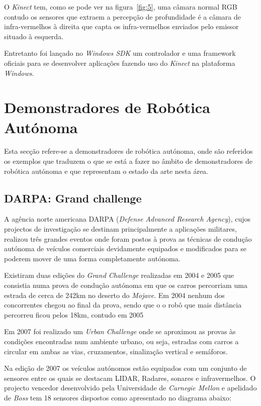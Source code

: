 O \emph{Kinect} tem, como se pode ver na figura~\ref{fig:5}, uma câmara normal RGB 
contudo os sensores que extraem a percepção de profundidade é a câmara de infra-vermelhos à direita
que capta os infra-vermelhos enviados pelo emissor situado à esquerda.

Entretanto foi lançado no \emph{Windows SDK} um controlador e uma framework oficiais para se 
desenvolver aplicações fazendo uso do \emph{Kinect} na plataforma \emph{Windows}.

\section{Demonstradores de Robótica Autónoma}
Esta secção refere-se a demonstradores de robótica autónoma, onde são referidos
os exemplos que traduzem o que se está a fazer no âmbito de demonstradores de
robótica autónoma e que representam o estado da arte nesta área.


\subsection{DARPA: Grand challenge}
A agência norte americana DARPA (\emph{Defense Advanced Research Agency}), cujos projectos de
investigação se destinam principalmente a aplicações militares, realizou três grandes
eventos onde foram postos à prova as técnicas de condução autónoma de veículos
comerciais devidamente equipados e modificados para se poderem mover de uma forma
completamente autónoma.  

Existiram duas edições do \emph{Grand Challenge} realizadas em 2004 e 2005 que consistia
numa prova de condução autónoma em que os carros percorriam uma estrada de cerca
de 242km no deserto do \emph{Mojave}. Em 2004 nenhum dos concorrentes chegou ao final da
prova, sendo que o o robô que mais distância percorreu ficou pelos 18km, contudo em 2005

Em 2007 foi realizado um \emph{Urban Challenge} onde se aproximou as provas às condições
encontradas num ambiente urbano, ou seja, estradas com carros a circular em ambas as
vias, cruzamentos, sinalização vertical  e semáforos.

Na edição de 2007 os veículos autónomos estão equipados com um conjunto de sensores
 entre os quais se destacam LIDAR, Radares, sonares e infravermelhos. O projecto
vencedor desenvolvido pela Universidade de \emph{Carnegie Mellon} e apelidado de
 \emph{Boss} \cite{Urmson:2008:ADU:1395073.1395077} tem
18 sensores dispostos como apresentado no diagrama abaixo:

